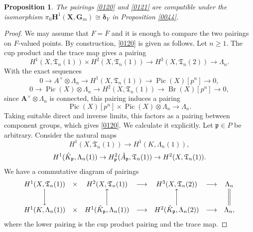 \documentclass{amsart}
\newtheorem{Prop}[Thm]{Proposition}
\theoremstyle{remark}
\numberwithin{equation}{section}
\newcommand{\tensor}{\mathbin{\otimes}}
\newcommand{\closure}[1]{\overline{#1}}
\newcommand{\Gm}{\mathbf{G}_{m}}
\newcommand{\alg}[1]{\mathbf{#1}}
\newcommand{\ideal}[1]{\mathfrak{#1}}
\newcommand{\varalg}[1]{\bm{#1}}
\DeclareMathOperator{\Pic}{Pic}
\DeclareMathOperator{\Br}{Br}
\begin{document}
\begin{Prop} \label{0111}
	The pairings \eqref{0120} and \eqref{0121} are compatible under the isomorphism
	$\pi_{0} \alg{H}^{1}(\alg{X}, \Gm) \cong \varalg{\delta}_{Y}$
	in Proposition \ref{0044}.
\end{Prop}

\begin{proof}
	We may assume that $F = \closure{F}$
	and it is enough to compare the two pairings on $F$-valued points.
	By construction, \eqref{0120} is given as follows.
	Let $n \ge 1$.
	The cup product and the trace map gives a pairing
		\[
					H^{1}(X, \mathfrak{T}_{n}(1))
				\times
					H^{2}(X, \mathfrak{T}_{n}(1))
			\to
					H^{3}(X, \mathfrak{T}_{n}(2))
			\to
				\Lambda_{n}.
		\]
	With the exact sequences
		\[
				0
			\to
				A^{\times} \tensor \Lambda_{n}
			\to
				H^{1}(X, \mathfrak{T}_{n}(1))
			\to
				\Pic(X)[p^{n}]
			\to
				0,
		\]
		\[
				0
			\to
				\Pic(X) \tensor \Lambda_{n}
			\to
				H^{2}(X, \mathfrak{T}_{n}(1))
			\to
				\Br(X)[p^{n}]
			\to
				0,
		\]
	since $\alg{A}^{\times} \tensor \Lambda_{n}$ is connected,
	this pairing induces a pairing
		\[
					\Pic(X)[p^{n}]
				\times
					\Pic(X) \tensor \Lambda_{n}
			\to
				\Lambda_{n}.
		\]
	Taking suitable direct and inverse limits,
	this factors as a pairing between component groups,
	which gives \eqref{0120}.
	We calculate it explicitly.
	Let $\ideal{p} \in P$ be arbitrary.
	Consider the natural maps
		\[
				H^{1}(X, \mathfrak{T}_{n}(1))
			\to
				H^{1}(K, \Lambda_{n}(1)),
		\]
		\[
				H^{1}(\Hat{K}_{\ideal{p}}, \Lambda_{n}(1))
			\to
				H^{2}_{\ideal{p}}(\Hat{A}_{\ideal{p}}, \mathfrak{T}_{n}(1))
			\to
				H^{2}(X, \mathfrak{T}_{n}(1)).
		\]
	We have a commutative diagram of pairings
		\[
			\begin{array}{ccccccc}
					H^{1}(X, \mathfrak{T}_{n}(1))
				&
					\times
				&
					H^{2}(X, \mathfrak{T}_{n}(1))
				&
					\longrightarrow
				&
					H^{3}(X, \mathfrak{T}_{n}(2))
				&
					\longrightarrow
				&
					\Lambda_{n}
				\\
					\bigg \downarrow
				&
				&
					\bigg \uparrow
				&
				&
					\bigg \uparrow
				&
				&
					\bigg \|
				\\
					H^{1}(K, \Lambda_{n}(1))
				&
					\times
				&
					H^{1}(\Hat{K}_{\ideal{p}}, \Lambda_{n}(1))
				&
					\longrightarrow
				&
					H^{2}(\Hat{K}_{\ideal{p}}, \Lambda_{n}(2))
				&
					\longrightarrow
				&
					\Lambda_{n},
			\end{array}
		\]
	where the lower pairing is the cup product pairing and the trace map.

\end{proof}
\end{document}
